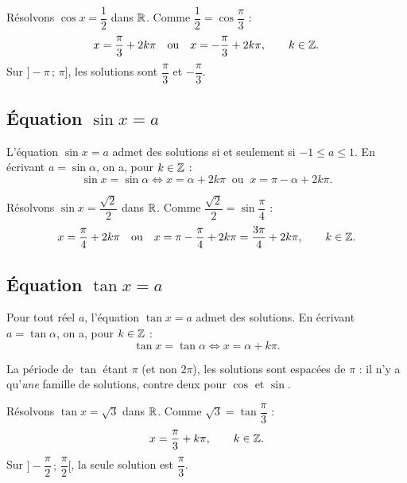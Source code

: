 \begin{exemple}
Résolvons $\cos x=\dfrac12$ dans $\mathbb{R}$. Comme $\dfrac12=\cos\dfrac{\pi}{3}$ :
\[
  x=\frac{\pi}{3}+2k\pi \quad\text{ou}\quad x=-\frac{\pi}{3}+2k\pi,\qquad k\in\mathbb{Z}.
\]
Sur $]-\pi\,;\,\pi]$, les solutions sont $\dfrac{\pi}{3}$ et $-\dfrac{\pi}{3}$.
\end{exemple}

\subsection{Équation $\sin x=a$}

\begin{theoreme}[Résolution de $\sin x=\sin\alpha$]
L'équation $\sin x=a$ admet des solutions si et seulement si $-1\le a\le 1$. En
écrivant $a=\sin\alpha$, on a, pour $k\in\mathbb{Z}$ :
\[
  \sin x=\sin\alpha \iff x=\alpha+2k\pi \ \text{ ou }\ x=\pi-\alpha+2k\pi.
\]
\end{theoreme}

\begin{exemple}
Résolvons $\sin x=\dfrac{\sqrt2}{2}$ dans $\mathbb{R}$. Comme $\dfrac{\sqrt2}{2}=\sin\dfrac{\pi}{4}$ :
\[
  x=\frac{\pi}{4}+2k\pi \quad\text{ou}\quad x=\pi-\frac{\pi}{4}+2k\pi=\frac{3\pi}{4}+2k\pi,\qquad k\in\mathbb{Z}.
\]
\end{exemple}

\subsection{Équation $\tan x=a$}

\begin{theoreme}[Résolution de $\tan x=\tan\alpha$]
Pour tout réel $a$, l'équation $\tan x=a$ admet des solutions. En écrivant
$a=\tan\alpha$, on a, pour $k\in\mathbb{Z}$ :
\[
  \tan x=\tan\alpha \iff x=\alpha+k\pi.
\]
\end{theoreme}

\begin{remarque}
La période de $\tan$ étant $\pi$ (et non $2\pi$), les solutions sont espacées de
$\pi$ : il n'y a qu'\emph{une} famille de solutions, contre deux pour $\cos$ et
$\sin$.
\end{remarque}

\begin{exemple}
Résolvons $\tan x=\sqrt3$ dans $\mathbb{R}$. Comme $\sqrt3=\tan\dfrac{\pi}{3}$ :
\[
  x=\frac{\pi}{3}+k\pi,\qquad k\in\mathbb{Z}.
\]
Sur $]-\dfrac{\pi}{2}\,;\,\dfrac{\pi}{2}[$, la seule solution est $\dfrac{\pi}{3}$.
\end{exemple}

